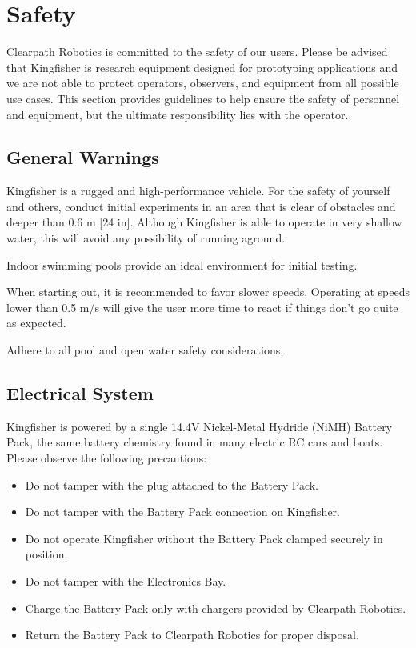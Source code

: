 \documentclass[]{clearpath-latex/clearpath-manual}
\begin{document}
\newpage

\section{Safety}
Clearpath Robotics is committed to the safety of our users. Please be advised that Kingfisher is research equipment designed for prototyping applications and we are not able to protect operators, observers, and equipment from all possible use cases. This section provides guidelines to help ensure the safety of personnel and equipment, but the ultimate responsibility lies with the operator.

\subsection{General Warnings}
Kingfisher is a rugged and high-performance vehicle. For the safety of yourself and others, conduct initial experiments in an area that is clear of obstacles and deeper than 0.6 m [24 in]. Although Kingfisher is able to operate in very shallow water, this will avoid any possibility of running aground.

Indoor swimming pools provide an ideal environment for initial testing.

When starting out, it is recommended to favor slower speeds. Operating at speeds lower than 0.5 m/s will give the user more time to react if things don’t go quite as expected.

Adhere to all pool and open water safety considerations.

\begin{warning}
Never operate the Kingfisher in a pool or other bodies of water while people are in the water.}
\end{warning}

\subsection{Electrical System}
Kingfisher is powered by a single 14.4V Nickel-Metal Hydride (NiMH) Battery Pack, the same battery chemistry found in many electric RC cars and boats. Please observe the following precautions:

\begin{itemize}[nolistsep]
	\item Do not tamper with the plug attached to the Battery Pack.
	\item Do not tamper with the Battery Pack connection on Kingfisher.
	\item Do not operate Kingfisher without the Battery Pack clamped securely in position.
	\item Do not tamper with the Electronics Bay.
	\item Charge the Battery Pack only with chargers provided by Clearpath Robotics.
	\item Return the Battery Pack to Clearpath Robotics for proper disposal.
\end{itemize}
\end{document}
